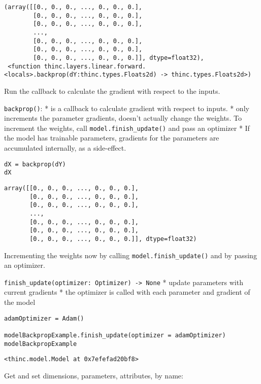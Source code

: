 \documentclass[
]{article}
\begin{document}
\begin{verbatim}
(array([[0., 0., 0., ..., 0., 0., 0.],
        [0., 0., 0., ..., 0., 0., 0.],
        [0., 0., 0., ..., 0., 0., 0.],
        ...,
        [0., 0., 0., ..., 0., 0., 0.],
        [0., 0., 0., ..., 0., 0., 0.],
        [0., 0., 0., ..., 0., 0., 0.]], dtype=float32),
 <function thinc.layers.linear.forward.<locals>.backprop(dY:thinc.types.Floats2d) -> thinc.types.Floats2d>)
\end{verbatim}

Run the callback to calculate the gradient with respect to the inputs.

\texttt{backprop()}: * is a callback to calculate gradient
with respect to inputs. * only increments the parameter gradients,
doesn't actually change the weights. To increment the weights, call
\texttt{model.finish_update()} and pass an optimizer * If
the model has trainable parameters, gradients for the parameters are
accumulated internally, as a side-effect.

\begin{verbatim}
dX = backprop(dY)
dX
\end{verbatim}

\begin{verbatim}
array([[0., 0., 0., ..., 0., 0., 0.],
       [0., 0., 0., ..., 0., 0., 0.],
       [0., 0., 0., ..., 0., 0., 0.],
       ...,
       [0., 0., 0., ..., 0., 0., 0.],
       [0., 0., 0., ..., 0., 0., 0.],
       [0., 0., 0., ..., 0., 0., 0.]], dtype=float32)
\end{verbatim}

Incrementing the weights now by calling
\texttt{model.finish_update()} and by passing an
optimizer.

\texttt{finish_update(optimizer: Optimizer) -> None} *
update parameters with current gradients * the optimizer is called with
each parameter and gradient of the model

\begin{verbatim}
adamOptimizer = Adam()

modelBackpropExample.finish_update(optimizer = adamOptimizer)
modelBackpropExample
\end{verbatim}

\begin{verbatim}
<thinc.model.Model at 0x7efefad20bf8>
\end{verbatim}

Get and set dimensions, parameters, attributes, by name:
\end{document}
